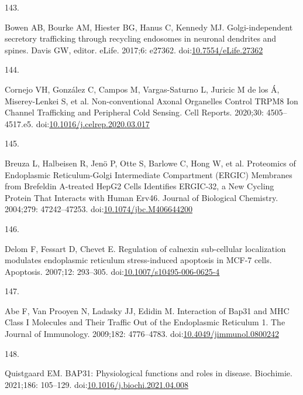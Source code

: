 \documentclass[
  12pt,
  a4paper,
]{book}
\newlength{\cslhangindent}
\newlength{\csllabelwidth}
\newlength{\cslentryspacingunit} %
\newenvironment{CSLReferences}[2] %
 {%
  \setlength{\parindent}{0pt}
  \ifodd #1
  \let\oldpar\par
  \def\par{\hangindent=\cslhangindent\oldpar}
  \fi
  \setlength{\parskip}{#2\cslentryspacingunit}
 }%
 {}
\newcommand{\CSLLeftMargin}[1]{\parbox[t]{\csllabelwidth}{#1}}
\newcommand{\CSLRightInline}[1]{\parbox[t]{\linewidth - \csllabelwidth}{#1}\break}
\begin{document}
\begin{CSLReferences}{0}{0}
\leavevmode{}%
\CSLLeftMargin{143. }%
\CSLRightInline{Bowen AB, Bourke AM, Hiester BG, Hanus C, Kennedy MJ. Golgi-independent secretory trafficking through recycling endosomes in neuronal dendrites and spines. Davis GW, editor. eLife. 2017;6: e27362. doi:\href{https://doi.org/10.7554/eLife.27362}{10.7554/eLife.27362}}

\leavevmode{}%
\CSLLeftMargin{144. }%
\CSLRightInline{Cornejo VH, González C, Campos M, Vargas-Saturno L, Juricic M de los Á, Miserey-Lenkei S, et al. Non-conventional {Axonal Organelles Control TRPM8 Ion Channel Trafficking} and {Peripheral Cold Sensing}. Cell Reports. 2020;30: 4505--4517.e5. doi:\href{https://doi.org/10.1016/j.celrep.2020.03.017}{10.1016/j.celrep.2020.03.017}}

\leavevmode{}%
\CSLLeftMargin{145. }%
\CSLRightInline{Breuza L, Halbeisen R, Jenö P, Otte S, Barlowe C, Hong W, et al. Proteomics of {Endoplasmic Reticulum-Golgi Intermediate Compartment} ({ERGIC}) {Membranes} from {Brefeldin A-treated HepG2 Cells Identifies ERGIC-32}, a {New Cycling Protein That Interacts} with {Human Erv46}. Journal of Biological Chemistry. 2004;279: 47242--47253. doi:\href{https://doi.org/10.1074/jbc.M406644200}{10.1074/jbc.M406644200}}

\leavevmode{}%
\CSLLeftMargin{146. }%
\CSLRightInline{Delom F, Fessart D, Chevet E. Regulation of calnexin sub-cellular localization modulates endoplasmic reticulum stress-induced apoptosis in {MCF-7} cells. Apoptosis. 2007;12: 293--305. doi:\href{https://doi.org/10.1007/s10495-006-0625-4}{10.1007/s10495-006-0625-4}}

\leavevmode{}%
\CSLLeftMargin{147. }%
\CSLRightInline{Abe F, Van Prooyen N, Ladasky JJ, Edidin M. Interaction of {Bap31} and {MHC Class I Molecules} and {Their Traffic Out} of the {Endoplasmic Reticulum} 1. The Journal of Immunology. 2009;182: 4776--4783. doi:\href{https://doi.org/10.4049/jimmunol.0800242}{10.4049/jimmunol.0800242}}

\leavevmode{}%
\CSLLeftMargin{148. }%
\CSLRightInline{Quistgaard EM. {BAP31}: {Physiological} functions and roles in disease. Biochimie. 2021;186: 105--129. doi:\href{https://doi.org/10.1016/j.biochi.2021.04.008}{10.1016/j.biochi.2021.04.008}}


\end{CSLReferences}
\end{document}
